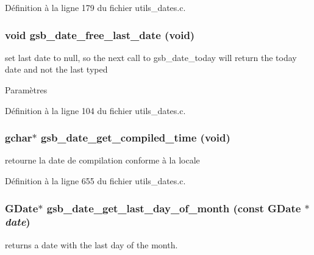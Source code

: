 Définition à la ligne 179 du fichier utils\_\-dates.c.

\subsubsection[{gsb\_\-date\_\-free\_\-last\_\-date}]{\setlength{\rightskip}{0pt plus 5cm}void gsb\_\-date\_\-free\_\-last\_\-date (void)}\label{utils__dates_8c_af8f672b19112b497c550cd33caf35d86}
set last date to null, so the next call to gsb\_\-date\_\-today will return the today date and not the last typed


\begin{DoxyParams}{Paramètres}
\item[{\em }]\end{DoxyParams}


Définition à la ligne 104 du fichier utils\_\-dates.c.

\subsubsection[{gsb\_\-date\_\-get\_\-compiled\_\-time}]{\setlength{\rightskip}{0pt plus 5cm}gchar$\ast$ gsb\_\-date\_\-get\_\-compiled\_\-time (void)}\label{utils__dates_8c_aabfe81bd576f533aff2f7cfebd52161c}
retourne la date de compilation conforme à la locale 

Définition à la ligne 655 du fichier utils\_\-dates.c.

\subsubsection[{gsb\_\-date\_\-get\_\-last\_\-day\_\-of\_\-month}]{\setlength{\rightskip}{0pt plus 5cm}GDate$\ast$ gsb\_\-date\_\-get\_\-last\_\-day\_\-of\_\-month (const GDate $\ast$ {\em date})}\label{utils__dates_8c_a72b939da505a26d0409317e4742af1f6}
returns a date with the last day of the month. 


